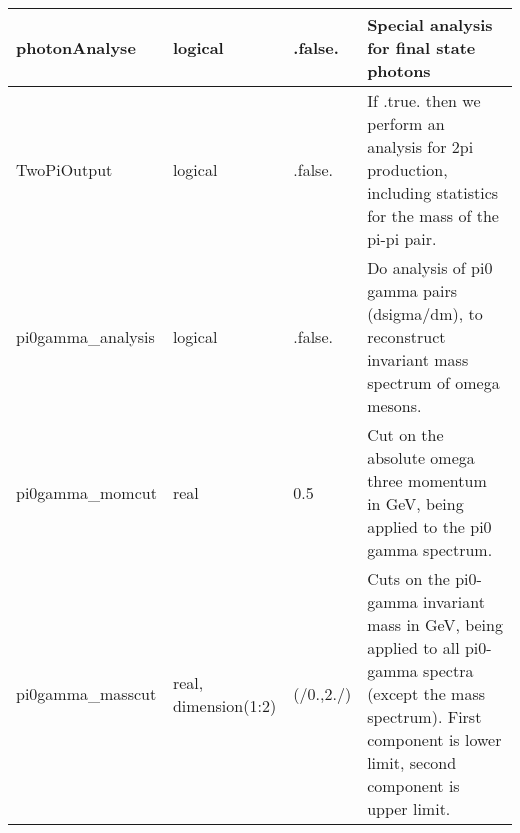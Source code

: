 \documentclass{article}
\begin{document}
\begin{longtable}{llll}
\midrule
photonAnalyse & \begin{minipage}[t]{2cm}logical\end{minipage} & \begin{minipage}[t]{2cm}.false.\end{minipage} & \begin{minipage}[t]{12cm}Special analysis for final state photons\end{minipage}\\*
\midrule
TwoPiOutput & \begin{minipage}[t]{2cm}logical\end{minipage} & \begin{minipage}[t]{2cm}.false.\end{minipage} & \begin{minipage}[t]{12cm}If .true. then we perform an analysis for 2pi production, including statistics for the mass of the pi-pi pair.\end{minipage}\\*
\midrule
pi0gamma\_analysis & \begin{minipage}[t]{2cm}logical\end{minipage} & \begin{minipage}[t]{2cm}.false.\end{minipage} & \begin{minipage}[t]{12cm}Do analysis of pi0 gamma pairs (dsigma/dm), to reconstruct invariant mass spectrum of omega mesons.\end{minipage}\\*
\midrule
pi0gamma\_momcut & \begin{minipage}[t]{2cm}real\end{minipage} & \begin{minipage}[t]{2cm}0.5\end{minipage} & \begin{minipage}[t]{12cm}Cut on the absolute omega three momentum in GeV, being applied to the pi0 gamma spectrum.\end{minipage}\\*
\midrule
pi0gamma\_masscut & \begin{minipage}[t]{2cm}real, dimension(1:2)\end{minipage} & \begin{minipage}[t]{2cm}(/0.,2./)\end{minipage} & \begin{minipage}[t]{12cm}Cuts on the pi0-gamma invariant mass in GeV, being applied to all pi0-gamma spectra (except the mass spectrum). First component is lower limit, second component is upper limit.\end{minipage}\\*

\end{longtable}
\end{document}
